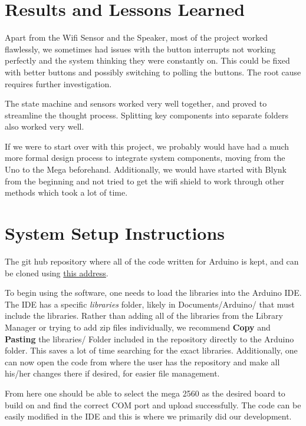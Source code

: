 \documentclass{article}
\begin{document}
\section{Results and Lessons Learned}
Apart from the Wifi Sensor and the Speaker, most of the project worked flawlessly, we sometimes had issues with the button interrupts not working perfectly and the system thinking they were constantly on. This could be fixed with better buttons and possibly switching to polling the buttons. The root cause requires further investigation. 

The state machine and sensors worked very well together, and proved to streamline the thought process. Splitting key components into separate folders also worked very well.  

If we were to start over with this project, we probably would have had a much more formal design process to integrate system components, moving from the Uno to the Mega beforehand. Additionally, we would have started with Blynk from the beginning and not tried to get the wifi shield to work through other methods which took a lot of time. 



\section{System Setup Instructions}
The git hub repository where all of the code written for Arduino is kept, and can be cloned using \href{https://github.com/langley2119/Embedded_System_SmartWalker.git}{this address}. 


To begin using the software, one needs to load the libraries into the Arduino IDE. The IDE has a specific \textsl{libraries} folder, likely in Documents/Arduino/ that must include the libraries. Rather than adding all of the libraries from the Library Manager or trying to add zip files individually, we recommend \textbf{Copy} and \textbf{Pasting} the libraries/ Folder included in the repository directly to the Arduino folder. This saves a lot of time searching for the exact libraries. Additionally, one can now open the code from where the user has the repository and make all his/her changes there if desired, for easier file management.  

From here one should be able to select the mega 2560 as the desired board to build on and find the correct COM port and upload successfully. The code can be easily modified in the IDE and this is where we primarily did our development.
\end{document}

